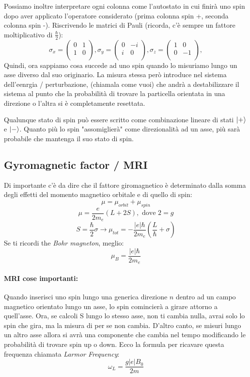 Possiamo inoltre interpretare ogni colonna come l'autostato in cui finirà uno spin dopo aver applicato l'operatore considerato (prima colonna spin +, seconda colonna spin -).
Riscrivendo le matrici di Pauli (ricorda, c'è sempre un fattore moltiplicativo di $\frac{\hbar}{2}$):
$$\sigma_x = \left(\begin{array}{lr}
	0 & 1\\	
	1 & 0\\	
\end{array}\right),
\sigma_y = \left(\begin{array}{lr}
	0 & -i\\	
	i & 0\\	
\end{array}\right),
\sigma_z = \left(\begin{array}{lr}
	1 & 0\\	
	0 & -1\\	
\end{array}\right),$$
Quindi, ora sappiamo cosa succede ad uno spin quando lo misuriamo lungo un asse diverso dal suo originario. La misura stessa però introduce nel sistema dell'eenrgia / perturbazione, (chiamala come vuoi) che andrà a destabilizzare il sistema al punto che la probabilità di trovare la particella orientata in una direzione o l'altra si è completamente resettata.

Qualunque stato di spin può essere scritto come combinazione lineare di stati $\ket{+}$ e $\ket{-}$. Quanto più lo spin "assomiglierà" come direzionalità ad un asse, più sarà probabile che mantenga il suo stato di spin.

\subsection{Gyromagnetic factor / MRI}
Di importante c'è da dire che il fattore giromagnetico è determinato dalla somma degli effetti del momento magnetico orbitale e di quello di spin:
$$\mu = \mu_{orbit} + \mu_{spin}$$
$$\mu = \frac{e}{2m_e} (L + 2S), \text{ dove } 2 = g$$
$$S = \frac{\hbar}{2}\sigma \rightarrow \mu_{tot} = -\frac{|e|\hbar}{2m_e}\left(\frac{L}{\hbar}+\sigma\right)$$
Se ti ricordi the \textit{Bohr magneton}, meglio:
$$\mu_B = \frac{|e|\hbar}{2m_e}$$

\paragraph{MRI cose importanti:} Quando inserisci uno spin lungo una generica direzione $n$ dentro ad un campo magnetico orientato lungo un asse, lo spin comincierà a girare attorno a quell'asse. Ora, se calcoli S lungo lo stesso asse, non ti cambia nulla, avrai solo lo spin che gira, ma la misura di per se non cambia. D'altro canto, se misuri lungo un altro asse allora si avrà una componente che cambia nel tempo modificando le probabilità di trovare spin up o down. Ecco la formula per ricavare questa frequenza chiamata \textit{Larmor Frequency}:
$$\omega_L = \frac{g|e|B_0}{2m}$$

